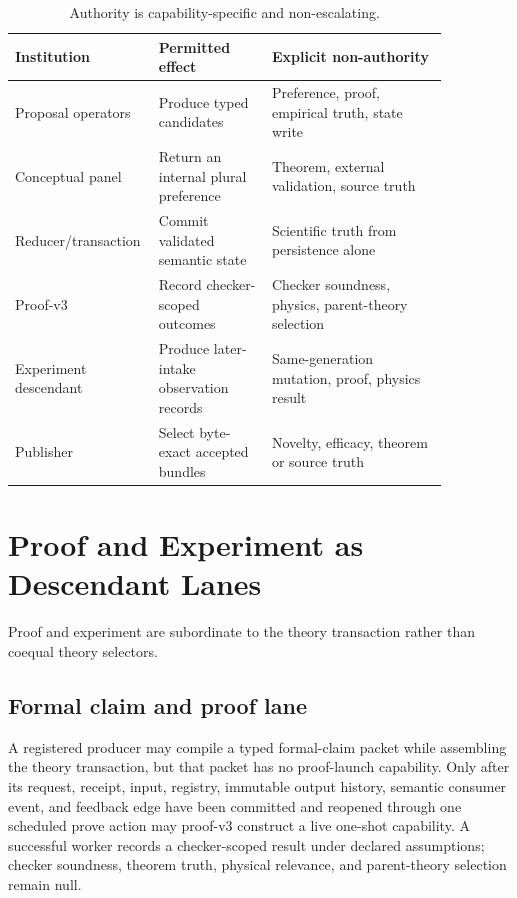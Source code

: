 \documentclass[11pt]{article}
\begin{document}
\begin{table}[ht]
\centering\small
\begin{tabular}{p{0.22\linewidth}p{0.25\linewidth}p{0.39\linewidth}}
\toprule
Institution & Permitted effect & Explicit non-authority \\
\midrule
Proposal operators & Produce typed candidates & Preference, proof, empirical truth, state write \\
Conceptual panel & Return an internal plural preference & Theorem, external validation, source truth \\
Reducer/transaction & Commit validated semantic state & Scientific truth from persistence alone \\
Proof-v3 & Record checker-scoped outcomes & Checker soundness, physics, parent-theory selection \\
Experiment descendant & Produce later-intake observation records & Same-generation mutation, proof, physics result \\
Publisher & Select byte-exact accepted bundles & Novelty, efficacy, theorem or source truth \\
\bottomrule
\end{tabular}
\caption{Authority is capability-specific and non-escalating.}
\end{table}

\section{Proof and Experiment as Descendant Lanes}

Proof and experiment are subordinate to the theory transaction rather than coequal theory selectors.

\subsection{Formal claim and proof lane}

A registered producer may compile a typed formal-claim packet while assembling the theory transaction, but that packet has no proof-launch capability. Only after its request, receipt, input, registry, immutable output history, semantic consumer event, and feedback edge have been committed and reopened through one scheduled prove action may proof-v3 construct a live one-shot capability. A successful worker records a checker-scoped result under declared assumptions; checker soundness, theorem truth, physical relevance, and parent-theory selection remain null.
\end{document}
